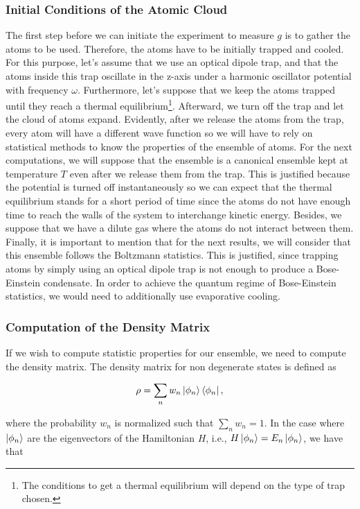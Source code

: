 \documentclass{article}
\begin{document}
\subsubsection{Initial Conditions of the Atomic Cloud}
The first step before we can initiate the experiment to measure $g$ is to gather the atoms to be used. Therefore, the atoms have to be initially trapped and cooled. For this purpose, let's assume that we use an optical dipole trap, and that the atoms inside this trap oscillate in the z-axis under a harmonic oscillator potential with frequency $\omega$. Furthermore, let's suppose that we keep the atoms trapped until they reach a thermal equilibrium\footnote{The conditions to get a thermal equilibrium will depend on the type of trap chosen.}. Afterward, we turn off the trap and let the cloud of atoms expand. Evidently, after we release the atoms from the trap, every atom will have a different wave function so we will have to rely on statistical methods to know the properties of the ensemble of atoms. For the next computations, we will suppose that the ensemble is a canonical ensemble kept at temperature $T$ even after we release them from the trap. This is justified because the potential is turned off instantaneously so we can expect that the thermal equilibrium stands for a short period of time since the atoms do not have enough time to reach the walls of the system to interchange kinetic energy. Besides, we suppose that we have a dilute gas where the atoms do not interact between them. Finally, it is important to mention that for the next results, we will consider that this ensemble follows the Boltzmann statistics. This is justified, since trapping atoms by simply using an optical dipole trap is not enough to produce a Bose-Einstein condensate. In order to achieve the quantum regime of Bose-Einstein statistics, we would need to additionally use evaporative cooling.

\subsubsection{Computation of the Density Matrix}
If we wish to compute statistic properties for our ensemble, we need to compute the density matrix. The density matrix for non degenerate states is defined as

\begin{equation}
    \rho = \sum_{n} w_{n} \ket{\phi_n} \bra{\phi_n},
\end{equation}

where the probability $w_{n}$ is normalized such that $\sum_{n} w_{n} = 1$. In the case where $\ket{\phi_n}$ are the eigenvectors of the Hamiltonian $H$, i.e., $H \ket{\phi_n} = E_n \ket{\phi_n}$, we have that
\end{document}
